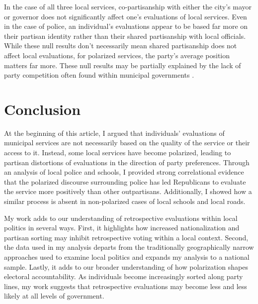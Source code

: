 In the case of all three local services, co-partisanship with either the city's mayor or governor does not significantly affect one's evaluations of local services. Even in the case of police, an individual's evaluations appear to be based far more on their partisan identity rather than their shared partisanship with local officials. While these null results don't necessarily mean shared partisanship does not affect local evaluations, for polarized services, the party's average position matters far more. These null results may be partially explained by the lack of party competition often found within municipal governments \citep{bucchianeriPartyCompetitionCoalitional2020}.



\section{Conclusion}

At the beginning of this article, I argued that individuals' evaluations of municipal services are not necessarily based on the quality of the service or their access to it. Instead, some local services have become polarized, leading to partisan distortions of evaluations in the direction of party preferences. Through an analysis of local police and schools, I provided strong correlational evidence that the polarized discourse surrounding police has led Republicans to evaluate the service more positively than other outpartisans. Additionally, I showed how a similar process is absent in non-polarized cases of local schools and local roads. 

My work adds to our understanding of retrospective evaluations within local politics in several ways. First, it highlights how increased nationalization and partisan sorting may inhibit retrospective voting within a local context. Second, the data used in my analysis departs from the traditionally geographically narrow approaches used to examine local politics and expands my analysis to a national sample. Lastly, it adds to our broader understanding of how polarization shapes electoral accountability. As individuals become increasingly sorted along party lines, my work suggests that retrospective evaluations may become less and less likely at all levels of government.

